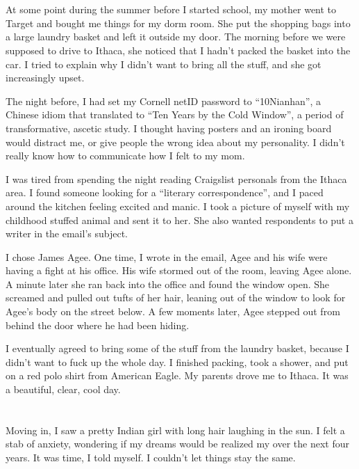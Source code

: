 \section{}
At some point during the summer before I started school, my mother went to
Target and bought me things for my dorm room.  She put the shopping bags into a
large laundry basket and left it outside my door.  The morning before we were
supposed to drive to Ithaca, she noticed that I hadn't packed the basket into
the car.  I tried to explain why I didn't want to bring all the stuff, and she
got increasingly upset.

The night before, I had set my Cornell netID password to ``10Nianhan'', a
Chinese idiom that translated to ``Ten Years by the Cold Window'', a period of
transformative, ascetic study.  I thought having posters and an ironing board
would distract me, or give people the wrong idea about my personality.  I didn't
really know how to communicate how I felt to my mom.

I was tired from spending the night reading Craigslist personals from the Ithaca
area.  I found someone looking for a ``literary correspondence'', and I paced
around the kitchen feeling excited and manic.  I took a picture of myself with
my childhood stuffed animal and sent it to her.  She also wanted respondents to
put a writer in the email's subject.

I chose James Agee.  One time, I wrote in the email, Agee and his wife were
having a fight at his office.  His wife stormed out of the room, leaving Agee
alone.  A minute later she ran back into the office and found the window open.
She screamed and pulled out tufts of her hair, leaning out of the window to look
for Agee's body on the street below.  A few moments later, Agee stepped out from
behind the door where he had been hiding.

I eventually agreed to bring some of the stuff from the laundry basket, because
I didn't want to fuck up the whole day.  I finished packing, took a shower, and
put on a red polo shirt from American Eagle.  My parents drove me to Ithaca.  It
was a beautiful, clear, cool day.  

\section{}

Moving in, I saw a pretty Indian girl with long hair laughing in the sun.  I
felt a stab of anxiety, wondering if my dreams would be realized my over the
next four years.  It was time, I told myself.  I couldn't let things stay the
same.


